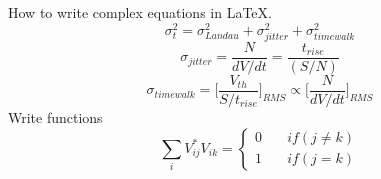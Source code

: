 \documentclass{book}
\begin{document}
How to write complex equations in LaTeX.
\begin{equation}
	\sigma_{t}^{2}=\sigma_{Landau}^{2}+\sigma_{jitter}^{2}+\sigma_{timewalk}^{2}
\end{equation}
\begin{equation}
\sigma_{jitter}=\frac{N}{dV/dt}=\frac{t_{rise}}{(S/N)}
\end{equation}
\begin{equation}
\sigma_{timewalk}=\Big[\frac{V_{th}}{S/t_{rise}}\Big]_{RMS}\propto\Big[\frac{N}{dV/dt}\Big]_{RMS}
\end{equation}
Write functions
\begin{equation}
\sum_{i}^{} V_{ij}^{*}V_{ik}= \left\{
\begin{array}{ll}
0 & \quad if (j\neq k) \\
1 & \quad if (j = k)
\end{array}
\right.
\end{equation}
\end{document}
